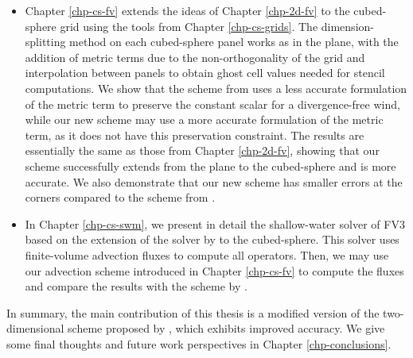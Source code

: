 \begin{itemize}
\item Chapter \ref{chp-cs-fv} extends the ideas of Chapter \ref{chp-2d-fv} to the cubed-sphere grid using the tools from Chapter \ref{chp-cs-grids}.
The dimension-splitting method on each cubed-sphere panel works as in the plane, 
with the addition of metric terms due to the non-orthogonality of the grid and interpolation between panels to obtain ghost cell values needed for stencil computations. 
We show that the scheme from \citet{putman:2007} uses a less accurate formulation of the metric term to preserve the constant scalar for a divergence-free wind,
while our new scheme may use a more accurate formulation of the metric term, as it does not have this preservation constraint. 
The results are essentially the same as those from Chapter \ref{chp-2d-fv}, 
showing that our scheme successfully extends from the plane to the cubed-sphere and is more accurate. 
We also demonstrate that our new scheme has smaller errors at the corners compared to the scheme from \citet{putman:2007}.

\item In Chapter \ref{chp-cs-swm}, we present in detail the shallow-water solver of FV3
based on the extension of the solver by \citet{lin:1997} to the cubed-sphere.
This solver uses finite-volume advection fluxes to compute all operators.
Then, we may use our advection scheme introduced in Chapter \ref{chp-cs-fv} 
to compute the fluxes and compare the results with the scheme by \citet{putman:2007}.
\end{itemize}

In summary, the main contribution of this thesis is a modified version of the two-dimensional scheme proposed by \citet{putman:2007}, which exhibits improved accuracy.
We give some final thoughts and future work perspectives in Chapter \ref{chp-conclusions}.